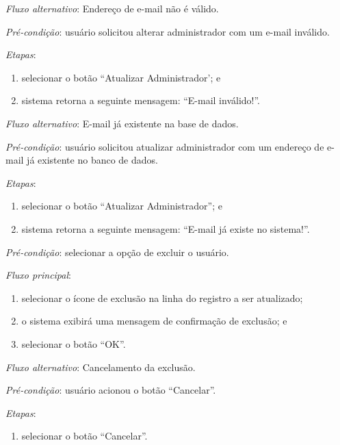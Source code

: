 \documentclass[a4paper,12pt]{article}
\begin{document}
\noindent \textit{Fluxo alternativo}: Endereço de e-mail não é válido.

\noindent \textit{Pré-condição}: usuário solicitou alterar administrador com um e-mail inválido.

\noindent \textit{Etapas}:

\begin{enumerate}
    \item selecionar o botão ``Atualizar Administrador'; e
    \item sistema retorna a seguinte mensagem: ``E-mail inválido!''.
\end{enumerate}


\noindent \textit{Fluxo alternativo}: E-mail já existente na base de dados.

\noindent \textit{Pré-condição}: usuário solicitou atualizar administrador com um endereço de e-mail já existente no banco de dados.

\noindent \textit{Etapas}:

\begin{enumerate}
    \item selecionar o botão ``Atualizar Administrador''; e
    \item sistema retorna a seguinte mensagem: ``E-mail já existe no sistema!''.
\end{enumerate}


\vspace{0.7cm}

\noindent \textit{Pré-condição}: selecionar a opção de excluir o usuário.

\noindent \textit{Fluxo principal}:

\begin{enumerate}
    \item selecionar o ícone de exclusão na linha do registro a ser atualizado;
    \item o sistema exibirá uma mensagem de confirmação de exclusão; e
    \item selecionar o botão ``OK''.
\end{enumerate}

\noindent \textit{Fluxo alternativo}: Cancelamento da exclusão.

\noindent \textit{Pré-condição}: usuário acionou o botão ``Cancelar''.

\noindent \textit{Etapas}:

\begin{enumerate}
    \item selecionar o botão ``Cancelar''.
\end{enumerate}
\end{document}
